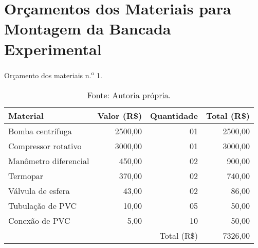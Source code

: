 
\chapter{Orçamentos dos Materiais para Montagem da Bancada Experimental}\label{cap:apendiceb}

\begin{table}[htb]%
\caption{Orçamento dos materiais n.\textsuperscript{o} 1.}%
\label{tab:tab3}%
\begin{tabularx}{\textwidth}{@{\extracolsep{\fill}}lrrr}%
\toprule
Material              & \multicolumn{1}{c}{Valor (R\$)} & \multicolumn{1}{c}{Quantidade}  & \multicolumn{1}{c}{Total (R\$)} \\ \midrule
Bomba centrífuga      & 2500,00                         & 01                              & 2500,00                         \\
Compressor rotativo   & 3000,00                         & 01                              & 3000,00                         \\
Manômetro diferencial & 450,00                          & 02                              & 900,00                          \\
Termopar              & 370,00                          & 02                              & 740,00                          \\
Válvula de esfera     & 43,00                           & 02                              & 86,00                           \\
Tubulação de PVC      & 10,00                           & 05                              & 50,00                           \\
Conexão de PVC        & 5,00                            & 10                              & 50,00                           \\ \midrule
                      &                                 & \multicolumn{1}{r}{Total (R\$)} & 7326,00                         \\ \bottomrule
\end{tabularx}
\caption*{Fonte: Autoria própria.}%
\end{table}

